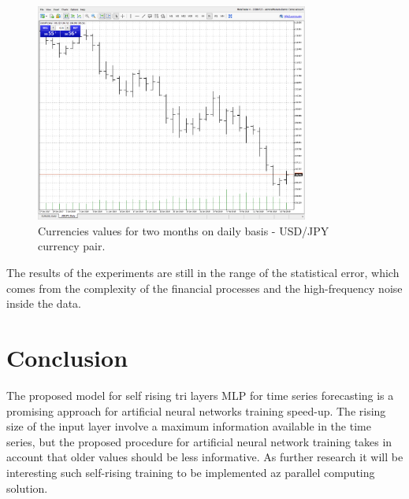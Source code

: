 \documentclass[11pt]{article}
\begin{document}
\begin{figure}[ht!]
   \centering
     \includegraphics[width=0.8\textwidth]{pic05}
    \caption {Currencies values for two months on daily basis - USD/JPY currency pair.}
\label{fig:pic05}
\end{figure}
\FloatBarrier

The results of the experiments are still in the range of the statistical error, which comes from the complexity of the financial processes and the high-frequency noise inside the data. 

\section{Conclusion} \label{Conclusion}

The proposed model for self rising tri layers MLP for time series forecasting is a promising approach for artificial neural networks training speed-up. The rising size of the input layer involve a maximum information available in the time series, but the proposed procedure for artificial neural network training takes in account that older values should be less informative. As further research it will be interesting such self-rising training to be implemented az parallel computing solution. 
\end{document}
